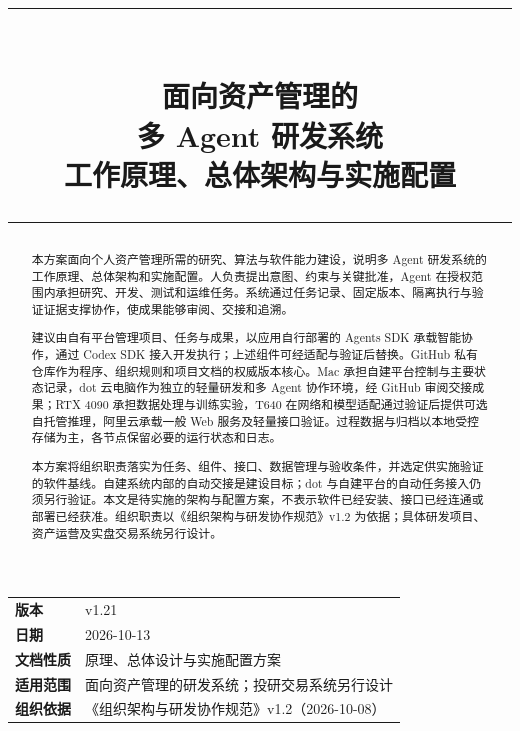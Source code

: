 \documentclass[11pt,a4paper]{article}
\title{%
  \vspace{-1.5cm}
  {\sffamily\color{primaryblue}\rule{\textwidth}{1.5pt}}\\[0.7cm]
  {\Huge\sffamily\bfseries\color{primaryblue} 面向资产管理的\\[0.25cm] 多 Agent 研发系统}\\[0.5cm]
  {\large\sffamily\color{darkgray} 工作原理、总体架构与实施配置}\\[0.5cm]
  {\sffamily\color{primaryblue}\rule{\textwidth}{1.5pt}}
}
\author{}
\date{}
\begin{document}
\maketitle
\thispagestyle{empty}

\vspace{0.8cm}
\begin{center}
\renewcommand{\arraystretch}{1.5}
\begin{tabular}{ll}
\textbf{版本} & v1.21 \\
\textbf{日期} & 2026-10-13 \\
\textbf{文档性质} & 原理、总体设计与实施配置方案\\
\textbf{适用范围} & 面向资产管理的研发系统；投研交易系统另行设计 \\
\textbf{组织依据} & 《组织架构与研发协作规范》v1.2（2026-10-08）\\
\end{tabular}
\end{center}

\vspace{1cm}
\begin{abstract}
\noindent 本方案面向个人资产管理所需的研究、算法与软件能力建设，说明多 Agent 研发系统的工作原理、总体架构和实施配置。人负责提出意图、约束与关键批准，Agent 在授权范围内承担研究、开发、测试和运维任务。系统通过任务记录、固定版本、隔离执行与验证证据支撑协作，使成果能够审阅、交接和追溯。

建议由自有平台管理项目、任务与成果，以应用自行部署的 Agents SDK 承载智能协作，通过 Codex SDK 接入开发执行；上述组件可经适配与验证后替换。GitHub 私有仓库作为程序、组织规则和项目文档的权威版本核心。Mac 承担自建平台控制与主要状态记录，dot 云电脑作为独立的轻量研发和多 Agent 协作环境，经 GitHub 审阅交接成果；RTX 4090 承担数据处理与训练实验，T640 在网络和模型适配通过验证后提供可选自托管推理，阿里云承载一般 Web 服务及轻量接口验证。过程数据与归档以本地受控存储为主，各节点保留必要的运行状态和日志。

本方案将组织职责落实为任务、组件、接口、数据管理与验收条件，并选定供实施验证的软件基线。自建系统内部的自动交接是建设目标；dot 与自建平台的自动任务接入仍须另行验证。本文是待实施的架构与配置方案，不表示软件已经安装、接口已经连通或部署已经获准。组织职责以《组织架构与研发协作规范》v1.2 为依据；具体研发项目、资产运营及实盘交易系统另行设计。
\end{abstract}

\newpage
\begingroup
\setlength{\parskip}{0pt}
\linespread{1.0}\selectfont
\tableofcontents
\endgroup
\newpage

\end{document}
